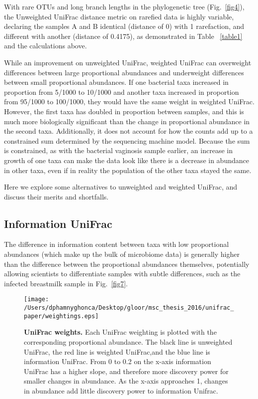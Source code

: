 \documentclass[10pt,letterpaper]{article}
\begin{document}
With rare OTUs and long branch lengths in the phylogenetic tree (Fig.~\ref{fig4}), the Unweighted UniFrac distance metric on rarefied data is highly variable, declaring the samples A and B identical (distance of 0) with 1 rarefaction, and different with another (distance of 0.4175), as demonstrated in Table ~\ref{table1} and the calculations above.

While an improvement on unweighted UniFrac, weighted UniFrac can overweight differences between large proportional abundances and underweight differences between small proportional abundances. If one bacterial taxa increased in proportion from 5/1000 to 10/1000 and another taxa increased in proportion from 95/1000 to 100/1000, they would have the same weight in weighted UniFrac. However, the first taxa has doubled in proportion between samples, and this is much more biologically significant than the change in proportional abundance in the second taxa. Additionally, it does not account for how the counts add up to a constrained sum determined by the sequencing machine model. Because the sum is constrained, as with the bacterial vaginosis sample earlier, an increase in growth of one taxa can make the data look like there is a decrease in abundance in other taxa, even if in reality the population of the other taxa stayed the same.

Here we explore some alternatives to unweighted and weighted UniFrac, and discuss their merits and shortfalls.

\FloatBarrier

\subsection{Information UniFrac}

The difference in information content between taxa with low proportional abundances (which make up the bulk of microbiome data) is generally higher than the difference between the proportional abundances themselves, potentially allowing scientists to differentiate samples with subtle differences, such as the infected breastmilk sample in Fig.~\ref{fig7}.

\begin{figure}[h]
\texttt{[image: /Users/dphamnyghonca/Desktop/gloor/msc\_thesis\_2016/unifrac\_paper/weightings.eps]}
\caption[UniFrac weights.]{{\bf UniFrac weights. }
Each UniFrac weighting is plotted with the corresponding proportional abundance. The black line is unweighted UniFrac, the red line is weighted UniFrac,and  the blue line is information UniFrac. From 0 to 0.2 on the x-axis information UniFrac has a higher slope, and therefore more discovery power for smaller changes in abundance. As the x-axis approaches 1, changes in abundance add little discovery power to information Unifrac.}
\label{fig5}
\end{figure}
\end{document}
